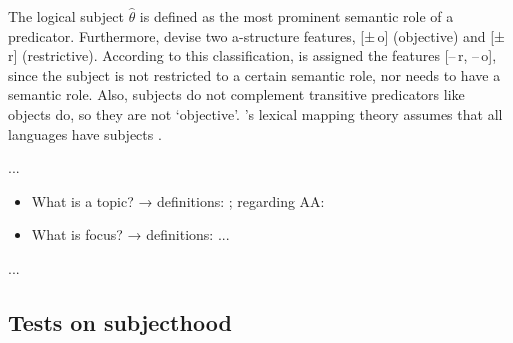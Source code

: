 The logical subject $\hat{\theta}$ is defined as 
{the most prominent semantic role of a predicator}. Furthermore,
\citet{bresnan2016} devise two a-structure features, [±\,o] (objective) and
[±\,r] (restrictive). According to this classification, \Subj{} is assigned the
features [–\,r, –\,o], since the subject is not restricted to a certain
semantic role, nor needs to have a semantic role. Also, subjects do not
complement transitive predicators like objects do, so they are not `objective'.
\citet{bresnan2016}'s lexical mapping theory assumes that all languages have
subjects \citep[330--331]{bresnan2016}.

...

\begin{itemize}
	\item What is a topic? → definitions: \textcites[171--175]{dixon2010}
	[]{givon1983}[]{lithompson1976}; regarding AA:
	\citet[55--68]{kroeger1991}
	\item What is focus? → definitions: ...
\end{itemize}

...

\subsection{Tests on subjecthood}

